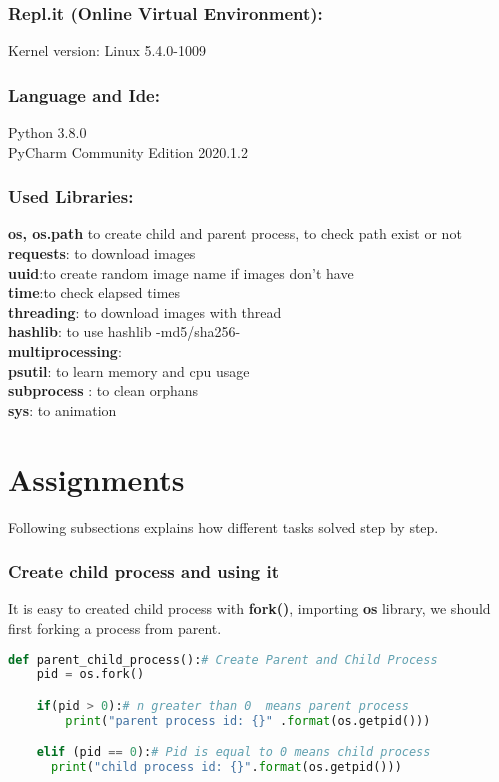 \documentclass[onecolumn]{article}
\begin{document}
\subsubsection{Repl.it (Online Virtual Environment):}
Kernel version: Linux 5.4.0-1009
 
\subsubsection{Language and Ide:}
Python  3.8.0 \\
PyCharm Community Edition 2020.1.2

\subsubsection{Used Libraries: }
\textbf{os, os.path}
to create child and parent process,
to check path exist or not  \\ 
\textbf{requests}: to download images\\ 
\textbf{uuid}:to create random image name if images don't have  \\ 
\textbf{time}:to check elapsed times \\ 
\textbf{threading}: to download images with thread\\ 
\textbf{hashlib}: to use hashlib -md5/sha256-  \\ 
\textbf{multiprocessing}:  \\ 
\textbf{ psutil}: to learn memory and cpu usage \\  
\textbf{ subprocess} : to clean orphans \\ 
\textbf{sys}: to animation

\section{Assignments}
Following subsections explains how different tasks solved step by step.

\subsubsection{Create child process and using it}
It is easy to created child process with \textbf{fork()},  importing \textbf{os} library, we should first forking a process from parent. \\

\begin{lstlisting}[language=Python, caption=Creating child process then writing its process id]
def parent_child_process():# Create Parent and Child Process
    pid = os.fork()                 

    if(pid > 0):# n greater than 0  means parent process 
	    print("parent process id: {}" .format(os.getpid()))

    elif (pid == 0):# Pid is equal to 0 means child process
      print("child process id: {}".format(os.getpid())) 
\end{lstlisting} \\ \\
\end{document}
